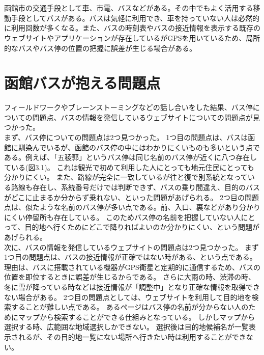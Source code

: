 \documentclass[openany,11pt,papersize]{jsbook}
\begin{document}
\section{}

函館市の交通手段として車、市電、バスなどがある。その中でもよく活用する移動手段としてバスがある。バスは気軽に利用でき、車を持っていない人は必然的に利用回数が多くなる。また、バスの時刻表やバスの接近情報を表示する既存のウェブサイトやアプリケーションが存在しているがGPSを用いているため、局所的なバスやバス停の位置の把握に誤差が生じる場合がある。


\section{函館バスが抱える問題点}

フィールドワークやブレーンストーミングなどの話し合いをした結果、バス停についての問題点、バスの情報を発信しているウェブサイトについての問題点が見つかった。\\
まず、バス停についての問題点は2つ見つかった。
1つ目の問題点は、バスは函館に馴染んでいるが、函館のバス停の中にはわかりにくいものも多いという点である。例えば、「五稜郭」というバス停は同じ名前のバス停が近くに八つ存在している(図3.1)。
これは観光で初めて利用した人にとっても地元住民にとっても分かりにくい。
また、路線が完全に一致しているが往と復で別系統となっている路線も存在し、系統番号だけでは判断できず、バスの乗り間違え、目的のバスがどこに止まるか分からず乗れない、といった問題があげられる。
2つ目の問題点は、似たような名前のバス停が多い点である。前、入口、裏などがあり分かりにくい停留所も存在している。
このためバス停の名前を把握していない人にとって、目的地へ行くためにどこで降りればよいのか分かりにくい、という問題があげられる。\\
次に、バスの情報を発信しているウェブサイトの問題点は2つ見つかった。
まず1つ目の問題点は、バスの接近情報が正確ではない時がある、という点である。
理由は、バスに搭載されている機器がGPS衛星と定期的に通信するため、バスの位置を即位するときに誤差が生じるからである。
さらに大雨の時、渋滞の時、冬に雪が降っている時などは接近情報が「調整中」となり正確な情報を取得できない場合がある。
2つ目の問題点としては、ウェブサイトを利用して目的地を検索することが難しい点である。
あるページはバス停の名前が分からない人のためにマップから検索することができる仕組みとなっている。
しかしマップから選択する時、広範囲な地域選択しかできない。
選択後は目的地候補名が一覧表示されるが、その目的地一覧にない場所へ行きたい時は利用することができない。
\end{document}
